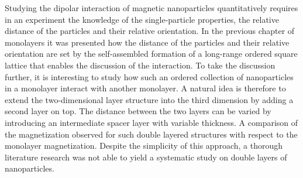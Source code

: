 \documentclass[\main/dresen_thesis.tex]{subfiles}
\begin{document}
  Studying the dipolar interaction of magnetic nanoparticles quantitatively requires in an experiment the knowledge of the single-particle properties, the relative distance of the particles and their relative orientation.
  In the previous chapter of monolayers it was presented how the distance of the particles and their relative orientation are set by the self-assembled formation of a long-range ordered square lattice that enables the discussion of the interaction.
  To take the discussion further, it is interesting to study how such an ordered collection of nanoparticles in a monolayer interact with another monolayer.
  A natural idea is therefore to extend the two-dimensional layer structure into the third dimension by adding a second layer on top.
  The distance between the two layers can be varied by introducing an intermediate spacer layer with variable thickness.
  A comparison of the magnetization observed for such double layered structures with respect to the monolayer magnetization.
  Despite the simplicity of this approach, a thorough literature research was not able to yield a systematic study on double layers of nanoparticles.
\end{document}
